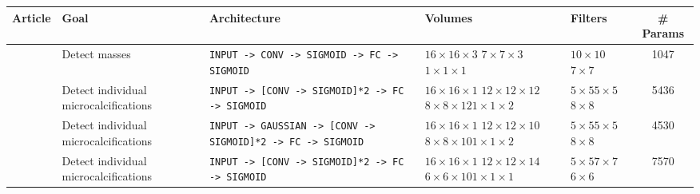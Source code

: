 \begin{comment}
- Unsupervised convolutional networks, trained as autoencoders with some slight variations.
\end{comment}



\begin{landscape}
\begin{table}
	\centering
	\begin{tabular}{cp{3.3cm}p{7cm}p{2cm}p{1.1cm}c}
		\hline
		\textbf{Article}&\textbf{Goal}&\textbf{Architecture}&\textbf{Volumes} & \textbf{Filters} & \textbf{\# Params}\\
		\hline
		\cite{Sahiner1996} & Detect masses & \texttt{INPUT -> CONV -> SIGMOID -> FC -> SIGMOID} & $16\times 16 \times 3$ \newline $7 \times 7 \times 3$ \newline $1\times 1 \times 1$ & $10 \times 10$ \newline $7 \times 7$ & 1047\\
		\cite{Lo1995}& Detect individual microcalcifications& \texttt{INPUT -> [CONV -> SIGMOID]*2 -> FC -> SIGMOID} & $16\times 16 \times 1$ \newline $12 \times 12 \times 12$\newline $8\times 8 \times 12$\newline $1 \times 1 \times 2$ & $5 \times 5$\newline $5 \times 5$ \newline $8 \times 8$& 5436 \\
		\cite{Lo1998}& Detect individual microcalcifications & \texttt{INPUT -> GAUSSIAN -> [CONV -> SIGMOID]*2 -> FC -> SIGMOID} & $16\times 16 \times 1$ \newline $12 \times 12 \times 10$\newline $8\times 8 \times 10$\newline $1 \times 1 \times 2$ & $5 \times 5$\newline $5 \times 5$ \newline $8 \times 8$& 4530 \\
		\cite{Gurcan2002}& Detect individual microcalcifications & \texttt{INPUT -> [CONV -> SIGMOID]*2 -> FC -> SIGMOID} & $16\times 16 \times 1$ \newline $12 \times 12 \times 14$\newline $6\times 6 \times 10$\newline $1 \times 1 \times 1$ & $5 \times 5$\newline $7 \times 7$ \newline $6 \times 6$& 7570 \\

\end{tabular}
\end{table}
\end{landscape}
